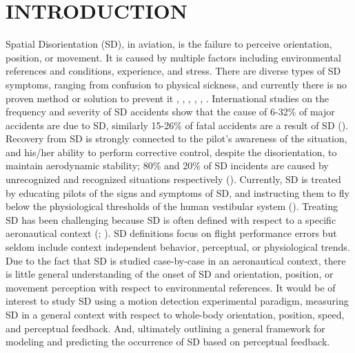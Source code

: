 \documentclass[11pt, onecolumn]{article}
\begin{document}


\maketitle

\section{INTRODUCTION}
\label{sec:introduction}

Spatial Disorientation (SD), in aviation, is the failure to perceive orientation, position, or movement. It is caused by multiple factors including environmental references and conditions, experience, and stress.  There are diverse types of SD symptoms, ranging from confusion to physical sickness, and currently there is no proven method or solution to prevent it \cite{Bles_2008_SD}, \cite{Gibb_2010_Aviation}, \cite{Perdriel_1980_SD}, \cite{Gillingham_1993_Spatial}, \cite{Previc_2004_Spatial}, \cite{Newman_2007_SD}.  International studies on the frequency and severity of SD accidents show that the cause of 6-32\% of major accidents are due to SD, similarly 15-26\% of fatal accidents are a result of SD (\cite{Newman_2007_SD}).  Recovery from SD is strongly connected to the pilot's awareness of the situation, and his/her ability to perform corrective control, despite the disorientation, to maintain aerodynamic stability; 80\% and 20\% of SD incidents are caused by unrecognized and recognized situations respectively (\cite{Bles_2008_SD}).  Currently, SD is treated by educating pilots of the signs and symptoms of SD, and instructing them to fly below the physiological thresholds of the human vestibular system (\cite{Previc_2004_Spatial}).  Treating SD has been challenging because SD is often defined with respect to a specific aeronautical context (\cite{Gillingham_1993_Spatial}; \cite{Newman_2007_SD}). SD definitions focus on flight performance errors but seldom include context independent behavior, perceptual, or physiological trends.  Due to the fact that SD is studied case-by-case in an aeronautical context, there is little general understanding of the onset of SD and orientation, position, or movement perception with respect to environmental references.  It would be of interest to study SD using a motion detection experimental paradigm, measuring SD in a general context with respect to whole-body orientation, position, speed, and perceptual feedback.  And, ultimately outlining a general framework for modeling and predicting the occurrence of SD based on perceptual feedback.
\end{document}

